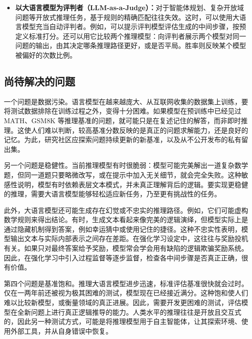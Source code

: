 \begin{itemize}
Cons@$k$ 为实际推理系统提供了一种实用评估方式，衡量模型能否稳定地得到正确答案。Pass@$k$ 评估是否至少有一个采样回答正确，Cons@$k$ 则偏好在多条采样推理路径中持续获得支持的答案，强调推理的可靠性。

\item \vspace{0.3em} \textbf{以大语言模型为评判者（LLM-as-a-Judge）：}对于智能体规划、复杂开放域问题等开放式推理任务，基于规则的精确匹配往往失效。这时，可以使用大语言模型充当自动评判者。例如，可以提示评判模型评估生成的中间步骤，按预定义标准打分。还可以用它比较两个推理模型：向评判者展示两个模型对同一问题的输出，由其决定哪条推理路径更好，或是否平局。胜率则反映某个模型被偏好的次数比例。
\end{itemize}
\vspace{0.5em}

\subsection{尚待解决的问题}

一个问题是数据污染。语言模型在越来越庞大、从互联网收集的数据集上训练，要将测试数据排除在训练过程之外，变得十分困难。如果模型在预训练中已经见过 MATH、GSM8K 等推理基准的问题，就可能只是在复述记住的解答，而非即时推理。这使人们难以判断，较高基准分数反映的是真正的问题求解能力，还是良好的记忆。为此，研究社区应探索问题持续更新的新基准，以及从不公开发布的私有留出集。

另一个问题是稳健性。当前推理模型有时很脆弱：模型可能完美解出一道复杂数学题，但同一道题只要略微改写，或在提示中加入无关细节，就会完全失败。这种敏感性说明，模型有时依赖表层文本模式，并未真正理解背后的逻辑。要实现更稳健的推理，需要大语言模型能够轻松适应新任务，乃至更有挑战性的任务。

此外，大语言模型还可能生成存在幻觉或不忠实的推理路径。例如，它们可能虚构数学规则来得出结论。有时，生成文本看起来像完美的逻辑演绎，但模型实际上是通过隐藏机制得到答案，例如幸运猜中或使用记住的捷径。这种不忠实性表明，模型输出文本与实际内部表示之间存在差距。在强化学习设定中，这往往与奖励投机有关。如果只对最终答案给予奖励，模型常会学会用有缺陷的逻辑欺骗奖励系统。因此，在强化学习中引入过程监督等逐步监督，检查各中间步骤是否真正正确，很有价值。

第四个问题是基准饱和。推理大语言模型进步迅速，标准评估基准很快就会过时。仅在一两年前还被视为极其困难的测试，模型现在已经接近满分。这种饱和使人们难以比较新模型，或衡量领域的真正进展。因此，需要开发更困难的测试，评估模型在全新问题上进行真正逻辑推导的能力。人类水平的推理往往是开放且交互式的，因此另一种测试方式，可能是将推理模型用于自主智能体，让其探索环境、使用外部工具，并从自身错误中恢复。

